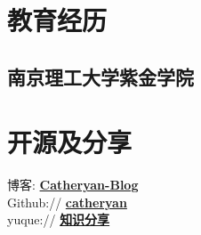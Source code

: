\documentclass[]{deedy-resume-openfont}
\begin{document}
%
%
\lastupdated

%
%

%
%

\begin{minipage}[t]{0.2\textwidth} 


\section{教育经历} 
\sectionsep

\subsection{南京理工大学紫金学院}
\sectionsep




\section{开源及分享}
\sectionsep
博客:  \href{https://catheryan.github.io/}{\bf Catheryan-Blog} \\   
Github:// \href{https://github.com/Catheryan/}{\bf catheryan} \\
yuque://  \href{https://www.yuque.com/g/juejiangdexiaohao/fflqe5/collaborator/join?token=98fARMSD1wPewTat&source=book_collaborator# 《项目整理》}{\bf 知识分享} \\




\end{minipage}
\end{document}
